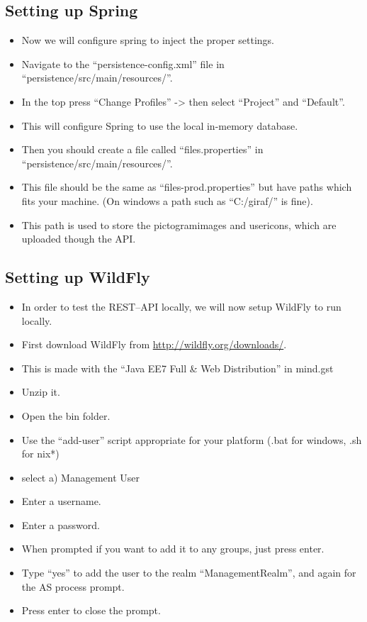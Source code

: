 \subsection*{Setting up Spring}
\begin{itemize}
    \item Now we will configure spring to inject the proper settings.
    \item Navigate to the ``persistence-config.xml'' file in ``persistence/src/main/resources/''.
    \item In the top press ``Change Profiles'' -> then select ``Project'' and ``Default''.
    \item This will configure Spring to use the local in-memory database.
    \item Then you should create a file called ``files.properties'' in ``persistence/src/main/resources/''.
    \item This file should be the same as ``files-prod.properties'' but have paths which fits your machine. (On windows a path such as ``C:/giraf/''
is fine).
    \item This path is used to store the pictogramimages and usericons, which are uploaded though the API.
\end{itemize}

\subsection*{Setting up WildFly}
\begin{itemize}
    \item In order to test the REST--API locally, we will now setup WildFly to run locally.
    \item First download WildFly from \url{http://wildfly.org/downloads/}.
    \item This is made with the ``Java EE7 Full \& Web Distribution'' in mind.gst
    \item Unzip it.
    \item Open the bin folder.
    \item Use the ``add-user'' script appropriate for your platform (.bat for windows, .sh for nix*)
    \item select a) Management User
    \item Enter a username.
    \item Enter a password.
    \item When prompted if you want to add it to any groups, just press enter.
    \item Type ``yes'' to add the user to the realm ``ManagementRealm'', and again for the AS process prompt.
    \item Press enter to close the prompt.
\end{itemize}

